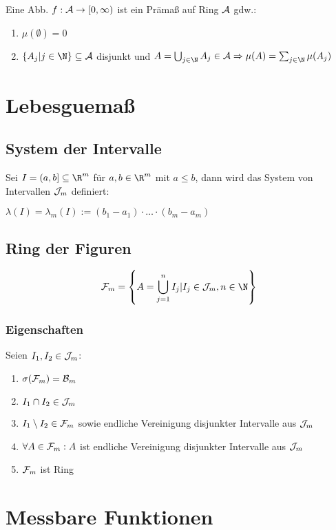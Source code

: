Eine Abb. $f : \mathcal{A} \to [0, \infty)$ ist ein Prämaß auf Ring $\mathcal{A}$ gdw.:

\begin{enumerate}[label=(\alph*)]
	\item $\mu(\emptyset) = 0$
	\item $\{A_j | j \in \N\} \subseteq \A$ disjunkt und $A = \bigcup_{j\in \N} A_j \in \A \Rightarrow \mu(A) = \sum_{j\in \N} \mu(A_j)$
\end{enumerate}

\section*{Lebesguemaß}

\subsection*{System der Intervalle}

Sei $I = (a, b] \subseteq \R^m$ für $a, b \in \R^m$ mit $a \leq b$, dann wird das System von Intervallen $\mathcal{J}_m$ definiert:

$\lambda(I) = \lambda_m(I) := (b_1 - a_1) \cdot \hdots \cdot (b_m - a_m)$

\subsection*{Ring der Figuren}

$$\F_m = \left\{ A = \bigcup_{j=1}^n I_j | I_j \in \J_m, n \in \N \right\}$$

\subsubsection*{Eigenschaften}

Seien $I_1, I_2 \in \mathcal{J}_m$:

\begin{enumerate}[label=(\alph*)]
	\item $\sigma(\mathcal{F}_m) = \mathcal{B}_m$
	\item $I_1 \cap I_2 \in \mathcal{J}_m$
	\item $I_1 \setminus I_2 \in \mathcal{F}_m$ sowie endliche Vereinigung disjunkter Intervalle aus $\mathcal{J}_m$
	\item $\forall A \in \mathcal{F}_m: A$ ist endliche Vereinigung disjunkter Intervalle aus $\mathcal{J}_m$
	\item $\mathcal{F}_m$ ist Ring
\end{enumerate}

\section*{Messbare Funktionen}

